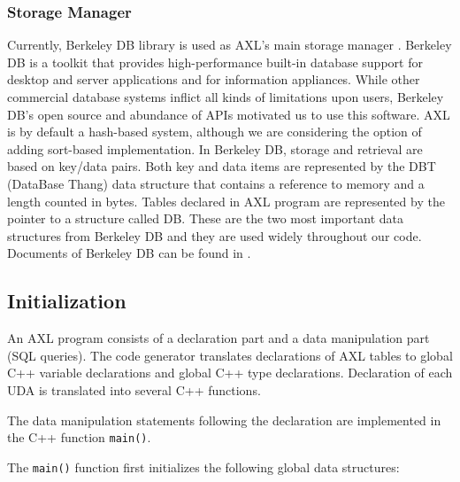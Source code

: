 \subsubsection*{Storage Manager}
Currently, Berkeley DB library is used as AXL's main storage manager
\cite{berkeley}.  Berkeley DB is a toolkit that provides
high-performance built-in database support for desktop and server
applications and for information appliances.  While other commercial
database systems inflict all kinds of limitations upon users, Berkeley
DB's open source and abundance of APIs motivated us to use this
software.  AXL is by default a hash-based system, although we are
considering the option of adding sort-based implementation.  In
Berkeley DB, storage and retrieval are based on key/data pairs.  Both
key and data items are represented by the DBT (DataBase Thang) data
structure that contains a reference to memory and a length counted in
bytes.  Tables declared in AXL program are represented by the pointer
to a structure called DB.  These are the two most important data
structures from Berkeley DB and they are used widely throughout our
code.  Documents of Berkeley DB can be found in \cite{berkeley}.

\subsection{Initialization}
An AXL program consists of a declaration part and a data manipulation
part (SQL queries).  The code generator translates declarations of AXL
tables to global C++ variable declarations and global C++ type
declarations.  Declaration of each UDA is translated into several C++
functions.

The data manipulation statements following the declaration are
implemented in the C++ function {\tt main()}.

The {\tt main()} function first initializes the following global data
structures:

